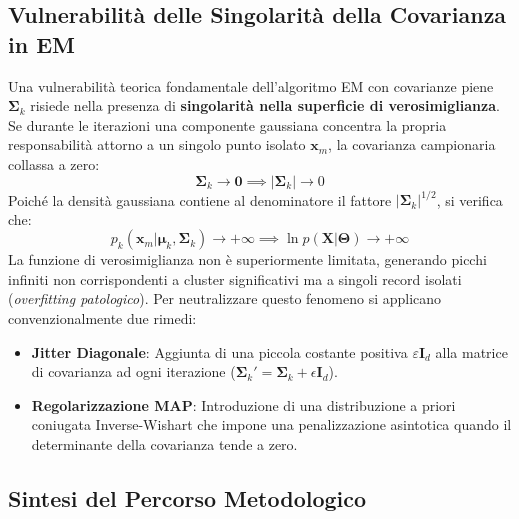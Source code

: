\FloatBarrier
\subsection{Vulnerabilità delle Singolarità della Covarianza in EM}

Una vulnerabilità teorica fondamentale dell'algoritmo EM con covarianze piene $\boldsymbol{\Sigma}_k$ risiede nella presenza di \textbf{singolarità nella superficie di verosimiglianza}. Se durante le iterazioni una componente gaussiana concentra la propria responsabilità attorno a un singolo punto isolato $\mathbf{x}_m$, la covarianza campionaria collassa a zero:
\begin{equation}
\boldsymbol{\Sigma}_k \to \mathbf{0} \implies |\boldsymbol{\Sigma}_k| \to 0
\end{equation}
Poiché la densità gaussiana contiene al denominatore il fattore $|\boldsymbol{\Sigma}_k|^{1/2}$, si verifica che:
\begin{equation}
p_k(\mathbf{x}_m | \boldsymbol{\mu}_k, \boldsymbol{\Sigma}_k) \to +\infty \implies \ln p(\mathbf{X} | \boldsymbol{\Theta}) \to +\infty
\end{equation}
La funzione di verosimiglianza non è superiormente limitata, generando picchi infiniti non corrispondenti a cluster significativi ma a singoli record isolati (\textit{overfitting patologico}). Per neutralizzare questo fenomeno si applicano convenzionalmente due rimedi:
\begin{itemize}
    \item \textbf{Jitter Diagonale}: Aggiunta di una piccola costante positiva $\varepsilon \mathbf{I}_d$ alla matrice di covarianza ad ogni iterazione ($\boldsymbol{\Sigma}_k' = \boldsymbol{\Sigma}_k + \epsilon \mathbf{I}_d$).
    \item \textbf{Regolarizzazione MAP}: Introduzione di una distribuzione a priori coniugata Inverse-Wishart che impone una penalizzazione asintotica quando il determinante della covarianza tende a zero.
\end{itemize}

\FloatBarrier
\subsection{Sintesi del Percorso Metodologico}

